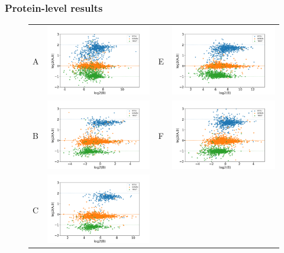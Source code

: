 \documentclass[11pt]{article}
\begin{document}
\subsubsection*{Protein-level results}
\begin{figure}[hbt]
    \centering
    \begin{tabular}{lclc} 
        A & \includegraphics[width=0.4\linewidth]{../../result/report_plots_pipeline/scatter_ID_triqler.png} & 
        E & \includegraphics[width=0.4\linewidth]{../../result/report_plots_pipeline/scatter_PS_triqler.png} \\ 
        B & \includegraphics[width=0.4\linewidth]{../../result/report_plots_pipeline/scatter_ID_msqrob2.png} & 
        F & \includegraphics[width=0.4\linewidth]{../../result/report_plots_pipeline/scatter_PS_msqrob2.png} \\ 
        C & \includegraphics[width=0.4\linewidth]{../../result/report_plots_pipeline/scatter_ID_msstats.png} & 

\end{tabular}
\end{figure}
\end{document}
